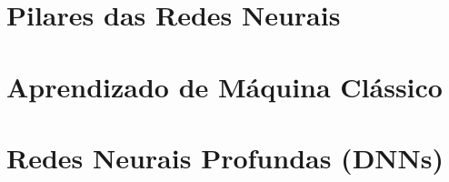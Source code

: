\documentclass[
    12pt,            %
    a4paper,         %
    book,            %
    openright,       %
    twoside,         %
    brazil           %
]{abntex2}
\begin{document}




\part{Pilares das Redes Neurais}









\part{Aprendizado de Máquina Clássico}








\part{Redes Neurais Profundas (DNNs)}













\end{document}
